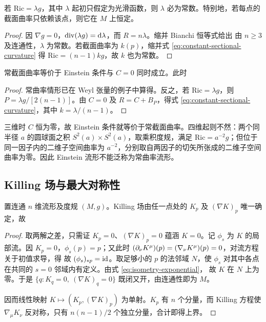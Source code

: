 \begin{theorem}[Schur]
    若 $\mathrm{Ric}=\lambda g$，其中 $\lambda$ 起初只假定为光滑函数，则 $\lambda$ 必为常数。特别地，若每点的截面曲率只依赖该点，则它在 $M$ 上恒定。
\end{theorem}
\begin{proof}
    因 $\nabla g=0$，$\operatorname{div}(\lambda g)=\dd\lambda$，而 $R=n\lambda$。缩并 Bianchi 恒等式给出
    由 $n\geqslant3$ 及连通性，$\lambda$ 为常数。若截面曲率为 $k(p)$，缩并式 \eqref{eq:constant-sectional-curvature} 得 $\mathrm{Ric}=(n-1)kg$，故 $k$ 也为常数。
\end{proof}

\begin{theorem}
    常截面曲率等价于 Einstein 条件与 $C=0$ 同时成立。此时
\end{theorem}
\begin{proof}
    常曲率情形已在 Weyl 张量的例子中算得。反之，若 $\mathrm{Ric}=\lambda g$，则 $P=\lambda g/[2(n-1)]$。由 $C=0$ 及 $R=C+B_P$，得式 \eqref{eq:constant-sectional-curvature}，其中 $k=\lambda/(n-1)$。
\end{proof}

\begin{example}
    三维时 $C$ 恒为零，故 Einstein 条件就等价于常截面曲率。四维起则不然：两个同半径 $a$ 的圆球面之积 $S^2(a)\times S^2(a)$，取乘积度规，满足 $\mathrm{Ric}=a^{-2}g$；但位于同一因子内的二维子空间曲率为 $a^{-2}$，分别取自两因子的切矢所张成的二维子空间曲率为零。因此 Einstein 流形不能泛称为常曲率流形。
\end{example}

\subsection{Killing 场与最大对称性}

\begin{theorem}\label{thm:killing-dimension}
    置连通 $n$ 维流形及度规 $(M,g)$。Killing 场由任一点处的 $K_p$ 及 $(\nabla K)_p$ 唯一确定，故
\end{theorem}
\begin{proof}
    取两解之差，只需证 $K_p=0$、$(\nabla K)_p=0$ 蕴涵 $K=0$。记 $\phi_s$ 为 $K$ 的局部流。因 $K_p=0$，$\phi_s(p)=p$；又此时 $(\partial_\nu K^\mu)(p)=(\nabla_\nu K^\mu)(p)=0$，对流方程关于初值求导，得
    故 $(\phi_s)_{*p}=\mathrm{id}$。取足够小的 $p$ 的法邻域 $N$，使 $\phi_s$ 对其中各点在共同的 $s=0$ 邻域内有定义。由式 \eqref{eq:isometry-exponential}，
    故 $K$ 在 $N$ 上为零。于是 $\{q:K_q=0,\ (\nabla K)_q=0\}$ 既闭又开，由连通性即为 $M$。

    因而线性映射 $K\mapsto(K_p,(\nabla K)_p)$ 为单射。$K_p$ 有 $n$ 个分量，而 Killing 方程使 $\nabla_\mu K_\nu$ 反对称，只有 $n(n-1)/2$ 个独立分量，合计即得上界。
\end{proof}

